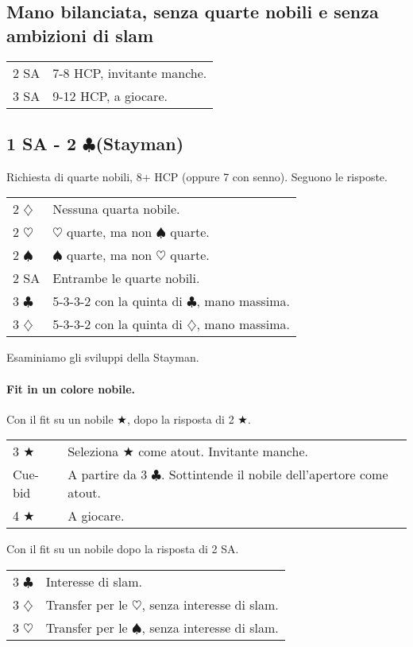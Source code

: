 \documentclass[a4paper,10pt]{article}
\renewcommand{\c}{$\clubsuit$\xspace}
\renewcommand{\d}{$\diamondsuit$\xspace}
\newcommand{\h}{$\heartsuit$\xspace}
\newcommand{\s}{$\spadesuit$\xspace}
\renewcommand{\j}{$\bigstar$\xspace}
\newcommand{\sa}{SA\xspace}
\newcommand{\smallspace}{\vskip0.3cm}
\newenvironment{twocol}
  {\smallspace\noindent\begin{tabular}{l p{0.78\textwidth}}}
  {\end{tabular}\smallspace}
\begin{document}
\subsection{Mano bilanciata, senza quarte nobili e senza ambizioni di slam}

\begin{twocol}
 2 \sa & 7-8 HCP, invitante manche.\\
 3 \sa & 9-12 HCP, a giocare.
\end{twocol}


\subsection{1 SA - 2 \c (Stayman)}

Richiesta di quarte nobili, 8+ HCP (oppure 7 con senno). Seguono le risposte.

\begin{twocol}
	2 \d & Nessuna quarta nobile. \\
	2 \h & \h quarte, ma non \s quarte. \\
	2 \s & \s quarte, ma non \h quarte. \\
	2 \sa & Entrambe le quarte nobili. \\
	3 \c & 5-3-3-2 con la quinta di \c, mano massima. \\
	3 \d & 5-3-3-2 con la quinta di \d, mano massima. \\
\end{twocol}

\noindent Esaminiamo gli sviluppi della Stayman.

\paragraph{Fit in un colore nobile.}

Con il fit su un nobile \j, dopo la risposta di 2 \j.
\begin{twocol}
	3 \j & Seleziona \j come atout. Invitante manche. \\
	Cue-bid & A partire da 3 \c. Sottintende il nobile dell'apertore come atout. \\
	4 \j & A giocare. \\
\end{twocol}

Con il fit su un nobile dopo la risposta di 2 \sa.

\begin{twocol}
	3 \c & Interesse di slam. \\
	3 \d & Transfer per le \h, senza interesse di slam. \\
	3 \h & Transfer per le \s, senza interesse di slam. \\
\end{twocol}
\end{document}
